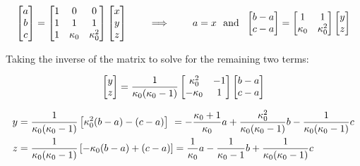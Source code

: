 \begin{equation}
\begin{bmatrix} 
a \\ b \\ c
\end{bmatrix}
 = \begin{bmatrix} 
	1 & 0 & 0 \\
	1 & 1 & 1\\
	1 & \ko & \ko^2 \\
\end{bmatrix}
\begin{bmatrix} 
x \\  y \\ z
\end{bmatrix}
\qquad 
\implies
\qquad 
a = x
%
\ \text{ and } \
%
\begin{bmatrix} 
b - a \\ c-a
\end{bmatrix}
 = \begin{bmatrix} 
	1 & 1\\
	\kappa_0 & \ko^2 \\
\end{bmatrix}
\begin{bmatrix} 
y \\ z
\end{bmatrix}
\end{equation}

Taking the inverse of the matrix to solve for the remaining two terms:

\begin{equation}
\begin{bmatrix} 
y \\ z
\end{bmatrix}
 = \frac{1}{\kappa_0 (\kappa_0 - 1)} \begin{bmatrix} 
	\kappa_0^2  & -1\\
	-\kappa_0 & 1 \\
\end{bmatrix}
\begin{bmatrix} 
b-a \\ c-a
\end{bmatrix}
\end{equation}

\begin{align}
y &=  \frac{1}{\kappa_0 (\kappa_0 - 1)} \left[  \kappa_0^2 (b-a) - (c-a) \right] \  = - \frac{\kappa_0+1}{\kappa_0} a + \frac{\kappa_0^2}{\kappa_0 (\kappa_0 - 1)} b - \frac{1}{\kappa_0 (\kappa_0 - 1)} c  \\
z &=   \frac{1}{\kappa_0 (\kappa_0 - 1)} \left[ - \kappa_0 (b-a) + (c-a)  \right]  =  \frac{1}{\kappa_0} a - \frac{1}{\kappa_0 - 1} b +  \frac{1}{\kappa_0 (\kappa_0 - 1)} c  
\end{align}

